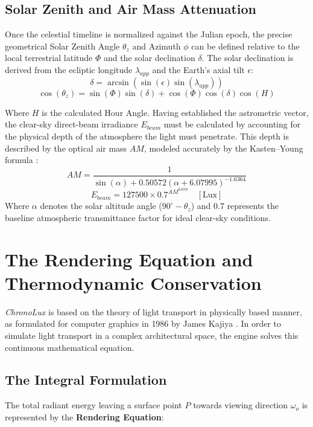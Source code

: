 \subsection{Solar Zenith and Air Mass Attenuation}
Once the celestial timeline is normalized against the Julian epoch, the precise geometrical Solar Zenith Angle $\theta_z$ and Azimuth $\phi$ can be defined relative to the local terrestrial latitude $\Phi$ and the solar declination $\delta$. The solar declination is derived from the ecliptic longitude $\lambda_{app}$ and the Earth's axial tilt $\epsilon$:
\begin{equation}
    \delta = \arcsin(\sin(\epsilon) \sin(\lambda_{app}))
\end{equation}
\begin{equation}
    \cos(\theta_z) = \sin(\Phi) \sin(\delta) + \cos(\Phi) \cos(\delta) \cos(H)
\end{equation}

Where $H$ is the calculated Hour Angle. Having established the astrometric vector, the clear-sky direct-beam irradiance $E_{beam}$ must be calculated by accounting for the physical depth of the atmosphere the light must penetrate. This depth is described by the optical air mass $AM$, modeled accurately by the Kasten–Young formula \cite{kasten1989revised}:
\begin{equation}
    AM = \frac{1}{\sin(\alpha) + 0.50572(\alpha + 6.07995)^{-1.6364}}
\end{equation}
\begin{equation}
    E_{beam} = 127500 \times 0.7^{AM^{0.678}} \quad [\text{Lux}]
\end{equation}
Where $\alpha$ denotes the solar altitude angle ($90^\circ - \theta_z$) and $0.7$ represents the baseline atmospheric transmittance factor for ideal clear-sky conditions.

\section{The Rendering Equation and Thermodynamic Conservation}
\textit{ChronoLux} is based on the theory of light transport in physically based manner, as formulated for computer graphics in 1986 by James Kajiya \cite{kajiya1986rendering}. In order to simulate light transport in a complex architectural space, the engine solves this continuous mathematical equation.

\subsection{The Integral Formulation}
The total radiant energy leaving a surface point $P$ towards viewing direction $\omega_o$ is represented by the \textbf{Rendering Equation}:

